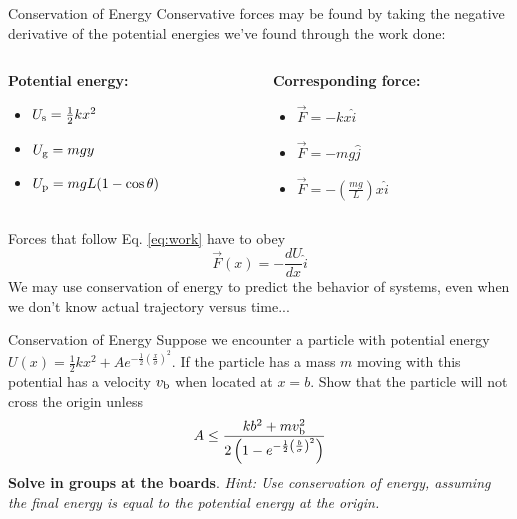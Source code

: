 \documentclass{beamer}
\begin{document}
\begin{frame}{Conservation of Energy}
\small
Conservative forces may be found by taking the negative derivative of the potential energies we've found through the work done: \\ \vspace{0.5cm}
\begin{columns}[T]
\begin{column}{0.5\textwidth}
\centering
\textbf{Potential energy:}
\begin{itemize}
\item $U_{\rm s} = \frac{1}{2}kx^2$
\item $U_{\rm g} = mgy$
\item $U_{\rm p} = mgL(1-\cos\theta)$
\end{itemize}
\end{column}
\begin{column}{0.5\textwidth}
\centering
\textbf{Corresponding force:}
\begin{itemize}
\item $\vec{F} = -kx\hat{i}$
\item $\vec{F} = -mg\hat{j}$
\item $\vec{F} = -\left(\frac{mg}{L}\right)x\hat{i}$
\end{itemize}
\end{column}
\end{columns}
Forces that follow Eq. \ref{eq:work} have to obey
\begin{equation}
\vec{F}(x) = -\frac{dU}{dx}\hat{i}
\end{equation}
We may use conservation of energy to predict the behavior of systems, even when we don't know actual trajectory versus time...
\end{frame}

\begin{frame}{Conservation of Energy}
\small Suppose we encounter a particle with potential energy $U(x) = \frac{1}{2}k x^2 + Ae^{-\frac{1}{2}\left(\frac{x}{\sigma}\right)^2}$.  If the particle has a mass $m$ moving with this potential has a velocity $v_{\rm b}$ when located at $x = b$.  Show that the particle will not cross the origin unless \\ \vspace{0.5cm}
\begin{equation}
A \leq \frac{kb^2 + m v_{\rm b}^2}{2\left(1-e^{-\frac{1}{2}\left(\frac{b}{\sigma}\right)^2}\right)}
\end{equation}
\textbf{Solve in groups at the boards}.  \textit{Hint: Use conservation of energy, assuming the final energy is equal to the potential energy at the origin.}
\end{frame}
\end{document}

